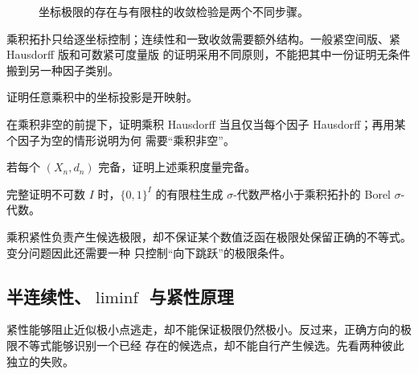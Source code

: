 \begin{figure}[htbp]
\centering
{}
\caption{坐标极限的存在与有限柱的收敛检验是两个不同步骤。}
\label{fig:1-2-2-tychonoff-coordinate-choice}
\end{figure}

乘积拓扑只给逐坐标控制；连续性和一致收敛需要额外结构。一般紧空间版、紧 Hausdorff 版和可数紧可度量版
的证明采用不同原则，不能把其中一份证明无条件搬到另一种因子类别。

\begin{exercise}
证明任意乘积中的坐标投影是开映射。
\end{exercise}
\begin{exercise}
在乘积非空的前提下，证明乘积 Hausdorff 当且仅当每个因子 Hausdorff；再用某个因子为空的情形说明为何
需要“乘积非空”。
\end{exercise}
\begin{exercise}
若每个 \((X_n,d_n)\) 完备，证明上述乘积度量完备。
\end{exercise}
\begin{exercise}
完整证明不可数 \(I\) 时，\(\{0,1\}^{I}\) 的有限柱生成 \(\sigma\)-代数严格小于乘积拓扑的 Borel
\(\sigma\)-代数。
\end{exercise}

乘积紧性负责产生候选极限，却不保证某个数值泛函在极限处保留正确的不等式。变分问题因此还需要一种
只控制“向下跳跃”的极限条件。

\subsection{半连续性、\texorpdfstring{\(\liminf\)}{liminf} 与紧性原理}
\label{subsec:1-2-3}

紧性能够阻止近似极小点逃走，却不能保证极限仍然极小。反过来，正确方向的极限不等式能够识别一个已经
存在的候选点，却不能自行产生候选。先看两种彼此独立的失败。

